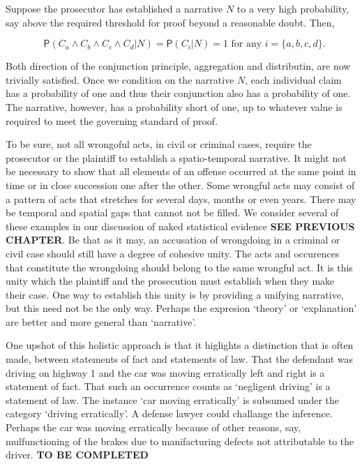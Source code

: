 \documentclass[10pt,dvipsnames,enabledeprecatedfontcommands]{scrartcl}
\newcommand{\pr}[1]{\mathsf{P}(#1)}
\begin{document}
Suppose the prosecutor has established a narrative \(N\) to a very high
probability, say above the required threshold for proof beyond a
reasonable doubt. Then,

\[\text{ $\pr{C_a\wedge C_b \wedge C_c\wedge C_d \vert N}=\pr{C_i \vert N}=1$ for any $i=\{a, b, c, d\}$}.\]

\noindent
Both direction of the conjunction principle, aggregation and
distributin, are now trivially satisfied. Once we condition on the
narrative \(N\), each individual claim has a probability of one and thus
their conjunction also has a probability of one. The narrative, however,
has a probability short of one, up to whatever value is required to meet
the governing standard of proof.

To be sure, not all wrongoful acts, in civil or criminal cases, require
the prosecutor or the plaintiff to establish a spatio-temporal
narrative. It might not be necessary to show that all elements of an
offense occurred at the same point in time or in close succession one
after the other. Some wrongful acts may consist of a pattern of acts
that stretches for several days, months or even years. There may be
temporal and spatial gaps that cannot not be filled. We consider several
of these examples in our discussion of naked statistical evidence
\textbf{SEE PREVIOUS CHAPTER}. Be that as it may, an accusation of
wrongdoing in a criminal or civil case should still have a degree of
cohesive unity. The acts and occurences that constitute the wrongdoing
should belong to the same wrongful act. It is this unity which the
plaintiff and the prosecution must establish when they make their case.
One way to establish this unity is by providing a unifying narrative,
but this need not be the only way. Perhaps the expresion `theory' or
`explanation' are better and more general than `narrative'.

One upshot of this holistic approach is that it higlights a distinction
that is often made, between statements of fact and statements of law.
That the defendant was driving on highway 1 and the car was moving
erratically left and right is a statement of fact. That such an
occurrence counts as `negligent driving' is a statement of law. The
instance `car moving erratically' is subsumed under the category
`driving erratically'. A defense lawyer could challange the inference.
Perhaps the car was moving erratically because of other reasons, say,
mulfunctioning of the brakes due to manifacturing defects not
attributable to the driver. \textbf{TO BE COMPLETED}
\end{document}
